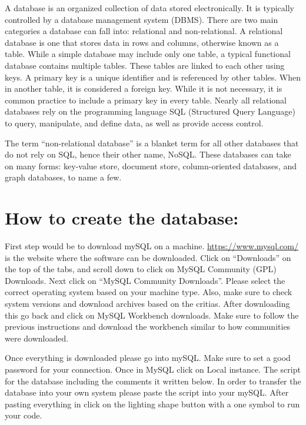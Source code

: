 \documentclass[]{book}
\begin{document}
A database is an organized collection of data stored electronically. It is typically controlled by a database management system (DBMS). There are two main categories a database can fall into: relational and non-relational. A relational database is one that stores data in rows and columns, otherwise known as a table. While a simple database may include only one table, a typical functional database contains multiple tables. These tables are linked to each other using keys. A primary key is a unique identifier and is referenced by other tables. When in another table, it is considered a foreign key. While it is not necessary, it is common practice to include a primary key in every table. Nearly all relational databases rely on the programming language SQL (Structured Query Language) to query, manipulate, and define data, as well as provide access control.

The term ``non-relational database'' is a blanket term for all other databases that do not rely on SQL, hence their other name, NoSQL. These databases can take on many forms: key-value store, document store, column-oriented databases, and graph databases, to name a few.

\hypertarget{how-to-create-the-database}{%
\section{How to create the database:}\label{how-to-create-the-database}}

First step would be to download mySQL on a machine.
\url{https://www.mysql.com/} is the website where the software can be downloaded.
Click on ``Downloads'' on the top of the tabs, and scroll down to click on MySQL Community (GPL) Downloads. Next click on ``MySQL Community Downloads''. Please select the correct operating system based on your machine type. Also, make sure to check system versions and download archives based on the critias. After downloading this go back and click on MySQL Workbench downloads. Make sure to follow the previous instructions and download the workbench similar to how communities were downloaded.

Once everything is downloaded please go into mySQL. Make sure to set a good password for your connection. Once in MySQL click on Local instance. The script for the database including the comments it written below. In order to transfer the database into your own system please paste the script into your mySQL. After pasting everything in click on the lighting shape button with a one symbol to run your code.
\end{document}
